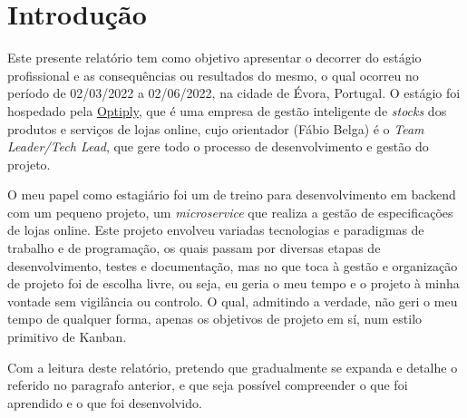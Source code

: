 \chapter{Introdução}
\label{intro}

Este presente relatório tem como objetivo apresentar o decorrer do estágio profissional e as consequências ou resultados do mesmo, o qual ocorreu no período de 02/03/2022 a 02/06/2022, na cidade de Évora, Portugal. O estágio foi hospedado pela \href{https://optiply.nl/}{Optiply}, que é uma empresa de gestão inteligente de \textit{stocks} dos produtos e serviços de lojas online, cujo orientador (Fábio Belga) é o \textit{Team Leader/Tech Lead}, que gere todo o processo de desenvolvimento e gestão do projeto.

O meu papel como estagiário foi um de treino para desenvolvimento em backend com um pequeno projeto, um \textit{microservice} que realiza a gestão de especificações de lojas online. Este projeto envolveu variadas tecnologias e paradigmas de trabalho e de programação, os quais passam por diversas etapas de desenvolvimento, testes e documentação, mas no que toca à gestão e organização de projeto foi de escolha livre, ou seja, eu geria o meu tempo e o projeto à minha vontade sem vigilância ou controlo. O qual, admitindo a verdade, não geri o meu tempo de qualquer forma, apenas os objetivos de projeto em sí, num estilo primitivo de Kanban.

Com a leitura deste relatório, pretendo que gradualmente se expanda e detalhe o referido no paragrafo anterior, e que seja possível compreender o que foi aprendido e o que foi desenvolvido.
